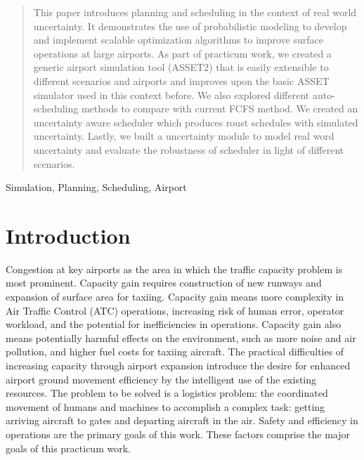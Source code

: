 \documentclass[conference]{IEEEtran}
\begin{document}
\begin{abstract}
    This paper introduces planning and scheduling in the context of real world uncertainty. It demonstrates the use of probabilistic modeling to develop and implement scalable optimization algorithms to improve surface operations at large airports. As part of practicum work, we created a generic airport simulation tool (ASSET2) that is easily extensible to different scenarios and airports and improves upon the basic ASSET simulator used in this context before. We also explored different auto-scheduling methods to compare with current FCFS method. We created an uncertainty aware scheduler which produces roust schedules with simulated uncertainty. Lastly, we built a uncertainty module to model real word uncertainty and evaluate the robustness of scheduler in light of different scenarios. 
\end{abstract}

\begin{IEEEkeywords}
    Simulation, Planning, Scheduling, Airport
\end{IEEEkeywords}

%
\IEEEpeerreviewmaketitle

\section{Introduction}
Congestion at key airports as the area in which the traffic capacity problem is most prominent. Capacity gain requires construction of new runways and expansion of surface area for taxiing. Capacity gain means more complexity in Air Traffic Control (ATC) operations, increasing risk of human error, operator workload, and the potential for inefficiencies in operations. Capacity gain also means potentially harmful effects on the environment, such as more noise and air pollution, and higher fuel costs for taxiing aircraft. The practical difficulties of increasing capacity through airport expansion introduce the desire for enhanced airport ground movement efficiency by the intelligent use of the existing resources. The problem to be solved is a logistics problem: the coordinated movement of humans and machines to accomplish a complex task: getting arriving aircraft to gates and departing aircraft in the air. Safety and efficiency in operations are the primary goals of this work. These factors comprise the major goals of this practicum work.
\end{document}
